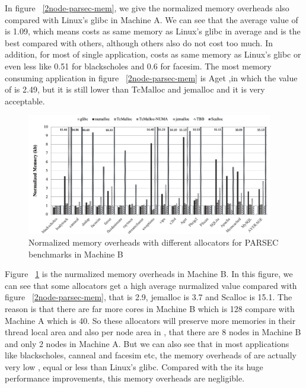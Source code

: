 In figure ~\ref{2node-parsec-mem}, we give the normalized memory overheads also compared with Linux's glibc in Machine A. We can see that the average value of \NM{} is 1.09, which means \NM{} costs as same memory as Linux's glibc in average and \NM{} is the best compared with others, although others also do not cost too much. In addition, for most of single application, \NM{} costs as same memory as Linux's glibc or even less like 0.51 for blackscholes and 0.6 for facesim. The most memory consuming application in figure ~\ref{2node-parsec-mem} is Aget ,in which the value of \NM{} is 2.49, but it is still lower than TcMalloc and jemalloc and it is very acceptable. 

\begin{figure}[H]
    \centering
    \includegraphics[width=\textwidth,height=200]{figure/8-node-parsec-mem.png}
    \caption{Normalized memory overheads with different allocators for PARSEC benchmarks in Machine B}
    \label{8node-parsec-mem}
\end{figure}

Figure ~\ref{8node-parsec-mem} is the nurmalized memory overheads in Machine B. In this figure, we can see that some allocators get a high average nurmalized value compared with figure ~\ref{2node-parsec-mem}, that \NM{} is 2.9, jemalloc is 3.7 and Scalloc is 15.1. The reason is that there are far more cores in Machine B which is 128 compare with Machine A which is 40. So these allocators will preserve more memories in their thread local area and also per node area in \NM{}, that there are 8 nodes in Machine B and only 2 nodes in Machine A. But we can also see that in most applications like blackscholes, canneal and facesim etc, the memory overheads of \NM{} are actually very low , equal or less than Linux's glibc. Compared with the its huge performance improvements, this memory overheads are negligible.

